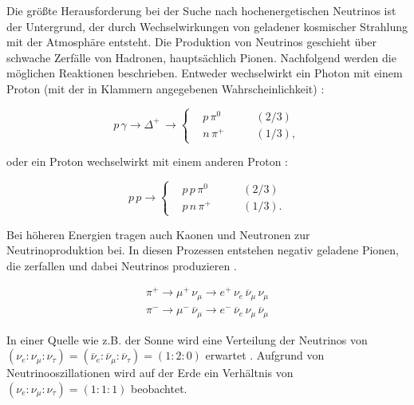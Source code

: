 Die größte Herausforderung bei der Suche nach hochenergetischen Neutrinos ist der Untergrund, der durch Wechselwirkungen von geladener kosmischer Strahlung mit der Atmosphäre entsteht.
Die Produktion von Neutrinos geschieht über schwache Zerfälle von Hadronen, hauptsächlich Pionen.
Nachfolgend werden die möglichen Reaktionen beschrieben.
Entweder wechselwirkt ein Photon mit einem Proton (mit der in Klammern angegebenen Wahrscheinlichkeit) \cite{DissBecker}:

\begin{equation*}
p\, \gamma \rightarrow \Delta^+ \, \rightarrow	
\left\{
\begin{aligned}
& p \, \pi^0 & \qquad (2/3) \\
& n \, \pi^+ & \qquad (1/3),
\end{aligned}
\right.
\end{equation*}

oder ein Proton wechselwirkt mit einem anderen Proton \cite{DissBecker}:

\begin{equation*}
p \, p \rightarrow
\left\{
\begin{aligned}
& p \, p \, \pi^0 & \qquad (2/3) \\
& p \, n \, \pi^+ & \qquad (1/3).
\end{aligned}
\right.
\end{equation*}

Bei höheren Energien tragen auch Kaonen und Neutronen zur Neutrinoproduktion bei.
In diesen Prozessen entstehen negativ geladene Pionen, die zerfallen und dabei Neutrinos produzieren \cite{NeutrinoOszillation}.

\begin{equation*}
 \begin{aligned}
 \pi^+ \rightarrow \mu^+ \, \nu_{\mu} \rightarrow e^+ \, \nu_e \, \overline{\nu}_{\mu} \, \nu_{\mu} \\ 
 \pi^- \rightarrow \mu^- \, \overline{\nu}_{\mu} \rightarrow e^- \, \overline{\nu}_e \, \nu_{\mu} \, \overline{\nu}_{\mu}
 \end{aligned}
\end{equation*}


In einer Quelle wie z.B. der Sonne wird eine Verteilung der Neutrinos von $(\nu_e:\nu_{\mu}:\nu_{\tau})=(\overline{\nu}_e:\overline{\nu}_{\mu}:\overline{\nu}_{\tau})=(1:2:0)$ erwartet \cite{NeutrinoOszillation}.
Aufgrund von Neutrinooszillationen wird auf der Erde ein Verhältnis von $(\nu_e:\nu_{\mu}:\nu_{\tau})=(1:1:1)$ \cite{NeutrinoOszillation} beobachtet.

